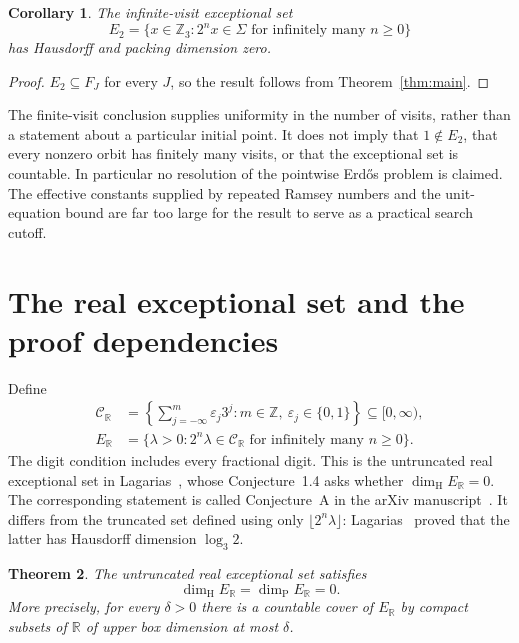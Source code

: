 \documentclass[11pt]{article}
\newtheorem{theorem}{Theorem}[section]
\newtheorem{corollary}[theorem]{Corollary}
\theoremstyle{definition}
\theoremstyle{remark}
\newcommand{\Z}{\mathbb Z}
\newcommand{\R}{\mathbb R}
\newcommand{\CR}{\mathcal C_{\R}}
\newcommand{\ER}{E_{\R}}
\newcommand{\dimH}{\dim_{\mathrm H}}
\newcommand{\dimP}{\dim_{\mathrm P}}
\begin{document}
\begin{corollary}
The infinite-visit exceptional set
\[
E_2=\{x\in\Z_3:2^nx\in\Sigma\text{ for infinitely many }n\ge0\}
\]
has Hausdorff and packing dimension zero.
\end{corollary}
\begin{proof}
$E_2\subseteq F_J$ for every $J$, so the result follows from
Theorem~\ref{thm:main}.
\end{proof}

The finite-visit conclusion supplies uniformity in the number of
visits, rather than a statement about a particular initial point.
It does not imply that $1\notin E_2$, that every nonzero orbit has
finitely many visits, or that the exceptional set is countable.
In particular no resolution of the pointwise Erd\H{o}s problem is
claimed. The effective constants supplied by repeated Ramsey numbers
and the unit-equation bound are far too large for the result to serve
as a practical search cutoff.

\section{The real exceptional set and the proof dependencies}\label{sec:real:statement}
Define
\begin{align*}
 \CR&=\left\{\sum_{j=-\infty}^{m}\varepsilon_j3^j:
       m\in\Z,\ \varepsilon_j\in\{0,1\}\right\}\subseteq[0,\infty),\\
 \ER&=\{\lambda>0:2^n\lambda\in\CR\text{ for infinitely many }n\ge0\}.
\end{align*}
The digit condition includes every fractional digit. This is the
untruncated real exceptional set in Lagarias~\cite[\S1.2]{Lagarias},
whose Conjecture~1.4 asks whether $\dimH\ER=0$. The corresponding
statement is called Conjecture~A in the arXiv manuscript~\cite{LagariasArxiv}.
It differs from the truncated set defined using only
$\lfloor2^n\lambda\rfloor$: Lagarias~\cite[Theorem~1.3]{Lagarias}
proved that the latter has Hausdorff dimension $\log_3 2$.

\begin{theorem}\label{real:thm:main}
The untruncated real exceptional set satisfies
\[
                    \boxed{\dimH\ER=\dimP\ER=0.}
\]
More precisely, for every $\delta>0$ there is a countable cover of
$\ER$ by compact subsets of $\R$ of upper box dimension at most $\delta$.
\end{theorem}
\end{document}
